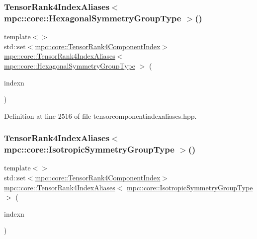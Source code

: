\subsubsection{\texorpdfstring{Tensor\+Rank4\+Index\+Aliases$<$ mpc\+::core\+::\+Hexagonal\+Symmetry\+Group\+Type $>$()}{TensorRank4IndexAliases< mpc::core::HexagonalSymmetryGroupType >()}}
{\footnotesize\ttfamily template$<$$>$ \\
std\+::set$<$\mbox{\hyperlink{namespacempc_1_1core_a54c081f41b2475abd10182bf023805d2}{mpc\+::core\+::\+Tensor\+Rank4\+Component\+Index}}$>$ \mbox{\hyperlink{namespacempc_1_1core_a40d1fb8009b3f7c34a6ea01a4b46027f}{mpc\+::core\+::\+Tensor\+Rank4\+Index\+Aliases}}$<$ \mbox{\hyperlink{structmpc_1_1core_1_1_hexagonal_symmetry_group_type}{mpc\+::core\+::\+Hexagonal\+Symmetry\+Group\+Type}} $>$ (\begin{DoxyParamCaption}\item[{const \mbox{\hyperlink{classmpc_1_1core_1_1_tensor_rank_n_component_index}{mpc\+::core\+::\+Tensor\+Rank\+N\+Component\+Index}}$<$ 4 $>$ \&}]{indexn }\end{DoxyParamCaption})\hspace{0.3cm}{\ttfamily [inline]}}



Definition at line 2516 of file tensorcomponentindexaliases.\+hpp.

\mbox{\label{namespacempc_1_1core_a843a34f476e1272ca8745eece0697e35}} 
\subsubsection{\texorpdfstring{Tensor\+Rank4\+Index\+Aliases$<$ mpc\+::core\+::\+Isotropic\+Symmetry\+Group\+Type $>$()}{TensorRank4IndexAliases< mpc::core::IsotropicSymmetryGroupType >()}}
{\footnotesize\ttfamily template$<$$>$ \\
std\+::set$<$\mbox{\hyperlink{namespacempc_1_1core_a54c081f41b2475abd10182bf023805d2}{mpc\+::core\+::\+Tensor\+Rank4\+Component\+Index}}$>$ \mbox{\hyperlink{namespacempc_1_1core_a40d1fb8009b3f7c34a6ea01a4b46027f}{mpc\+::core\+::\+Tensor\+Rank4\+Index\+Aliases}}$<$ \mbox{\hyperlink{structmpc_1_1core_1_1_isotropic_symmetry_group_type}{mpc\+::core\+::\+Isotropic\+Symmetry\+Group\+Type}} $>$ (\begin{DoxyParamCaption}\item[{const \mbox{\hyperlink{classmpc_1_1core_1_1_tensor_rank_n_component_index}{mpc\+::core\+::\+Tensor\+Rank\+N\+Component\+Index}}$<$ 4 $>$ \&}]{indexn }\end{DoxyParamCaption})\hspace{0.3cm}{\ttfamily [inline]}}



